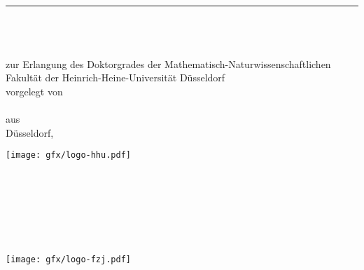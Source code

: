 \begin{titlepage}
	\flushright
	\hfill
	\vfill
	{\LARGE\thesisTitle \par}
	\rule[5pt]{\textwidth}{.4pt} \par
	{\Large\thesisName}
	\vfill
	\textit{\large\thesisDate} %
\end{titlepage}
%
%
\begin{titlepage}
	\tgherosfont
	\centering
	\phantom{}\\[0mm]
	\vfill
	{\Huge \color{ctcolortitle}\textbf{\thesisTitle} \\[25mm]}
	{\LARGE \thesisSubject} \\[20mm]
	{\Large zur Erlangung des Doktorgrades	der Mathematisch-Naturwissenschaftlichen Fakultät der Heinrich-Heine-Universität Düsseldorf} \\[15mm]
	{\Large vorgelegt von} \\[5mm]
	{\Large \thesisName} \\[0mm]
	{\small aus \thesisBirthPlace} \\[30mm]
	{\Large D{\"u}sseldorf, \thesisDate}
	\vfill
\end{titlepage}
%
%
% 
\begin{minipage}[t]{6.475cm}
	\texttt{[image: gfx/logo-hhu.pdf]} \\[5mm]
	\textbf{\thesisUniversity} \\
	\small
	\thesisUniversityDepartment \\
	\thesisUniversityStreetAddress \\
	\thesisUniversityPostalCode \\
	\phantom{} \\
	\phantom{} \\
	\phantom{}
\end{minipage}
\hspace*{1.02303cm}%
\begin{minipage}[t]{6.475cm}
	\texttt{[image: gfx/logo-fzj.pdf]} \\[5mm]
	\textbf{\thesisInstitute} \\
	\small
	\thesisInstituteDepartment \\
	\thesisInstituteInstitute \\
	\thesisInstituteGroup \\
	\thesisInstituteStreetAddress \\
	\thesisInstitutePostalCode 
\end{minipage}
